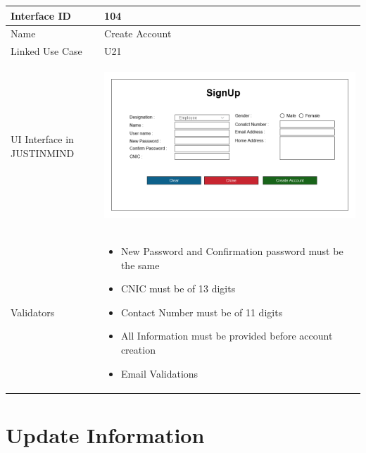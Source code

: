 \documentclass[12pt,a4paper]{report}
\begin{document}
\begin{tabular}{ | m{3cm} | m{12cm}| } \hline

Interface ID &   104 \\\hline

Name  	      &   Create Account\\ \hline

Linked Use Case &  U21\\ \hline

UI Interface in JUSTINMIND & \begin{center} \includegraphics[scale=0.3]{./UIs for Latex Reports/UI-004 Create Account@1x.png}\end{center}  \\ \hline

Validators & 
\begin{itemize}
\item   New Password and Confirmation password must be the same
\item  CNIC must be of 13 digits
\item  Contact Number must be of 11 digits
\item  All Information must be provided before account creation
\item  Email Validations


\end{itemize}
\\ \hline

\end{tabular} 

\section{Update Information}
\end{document}
